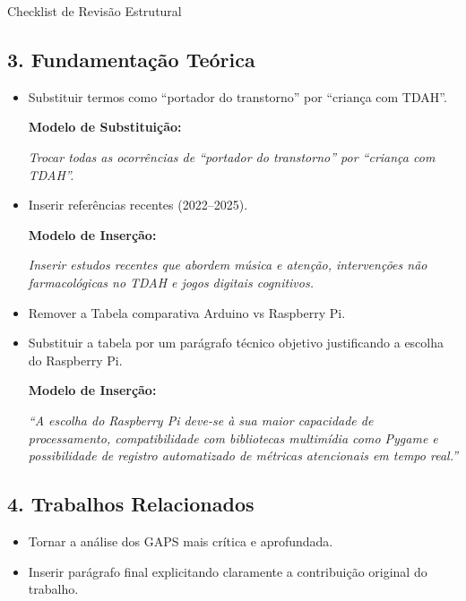 \documentclass[11pt,a4paper]{article}
\begin{document}
\begin{boxAvisos}{Checklist de Revisão Estrutural}

\subsection*{3. Fundamentação Teórica}

\begin{itemize}
    \item[$\boxtimes$] Substituir termos como ``portador do transtorno'' por ``criança com TDAH''.
    
    \textbf{Modelo de Substituição:}
    
    \textit{Trocar todas as ocorrências de ``portador do transtorno'' por ``criança com TDAH''.}

    \item[$\boxtimes$] Inserir referências recentes (2022--2025).
    
    \textbf{Modelo de Inserção:}
    
    \textit{Inserir estudos recentes que abordem música e atenção, intervenções não farmacológicas no TDAH e jogos digitais cognitivos.}

    \item[$\boxtimes$] Remover a Tabela comparativa Arduino vs Raspberry Pi.
    
    \item[$\boxtimes$] Substituir a tabela por um parágrafo técnico objetivo justificando a escolha do Raspberry Pi.
    
    \textbf{Modelo de Inserção:}
    
    \textit{``A escolha do Raspberry Pi deve-se à sua maior capacidade de processamento, compatibilidade com bibliotecas multimídia como Pygame e possibilidade de registro automatizado de métricas atencionais em tempo real.''}
\end{itemize}


\subsection*{4. Trabalhos Relacionados}

\begin{itemize}
    \item[$\Box$] Tornar a análise dos GAPS mais crítica e aprofundada.
    
    \item[$\Box$] Inserir parágrafo final explicitando claramente a contribuição original do trabalho.
    

\end{itemize}
\end{boxAvisos}
\end{document}
